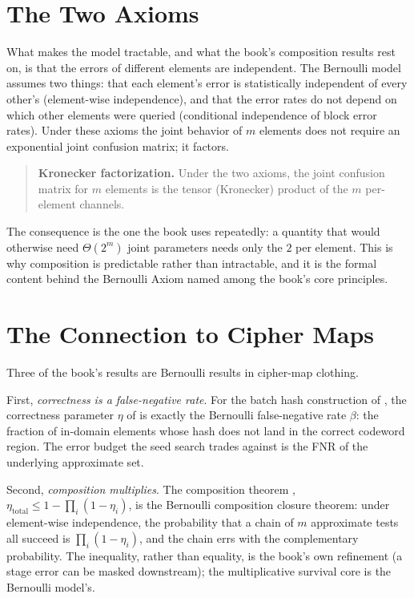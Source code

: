 \section{The Two Axioms}
\label{sec:bernoulli-axioms}

What makes the model tractable, and what the book's composition results rest
on, is that the errors of different elements are independent. The Bernoulli
model assumes two things: that each element's error is statistically
independent of every other's (element-wise independence), and that the error
rates do not depend on which other elements were queried (conditional
independence of block error rates). Under these axioms the joint behavior of
$m$ elements does not require an exponential joint confusion matrix; it
factors.

\begin{quote}
\textbf{Kronecker factorization.} Under the two axioms, the joint confusion
matrix for $m$ elements is the tensor (Kronecker) product of the $m$
per-element channels.
\end{quote}

The consequence is the one the book uses repeatedly: a quantity that would
otherwise need $\Theta(2^m)$ joint parameters needs only the $2$ per element.
This is why composition is predictable rather than intractable, and it is the
formal content behind the Bernoulli Axiom named among the book's core
principles.

\section{The Connection to Cipher Maps}
\label{sec:bernoulli-cipher-link}

Three of the book's results are Bernoulli results in cipher-map clothing.

First, \emph{correctness is a false-negative rate}. For the batch hash
construction of , the correctness parameter
$\eta$ of  is exactly the Bernoulli false-negative
rate $\beta$: the fraction of in-domain elements whose hash does not land in
the correct codeword region. The error budget the seed search trades against
is the FNR of the underlying approximate set.

Second, \emph{composition multiplies}. The composition theorem
, $\eta_{\mathrm{total}} \le 1 - \prod_i(1 - \eta_i)$,
is the Bernoulli composition closure theorem: under element-wise
independence, the probability that a chain of $m$ approximate tests all
succeed is $\prod_i(1 - \eta_i)$, and the chain errs with the complementary
probability. The inequality, rather than equality, is the book's own
refinement (a stage error can be masked downstream); the multiplicative
survival core is the Bernoulli model's.

